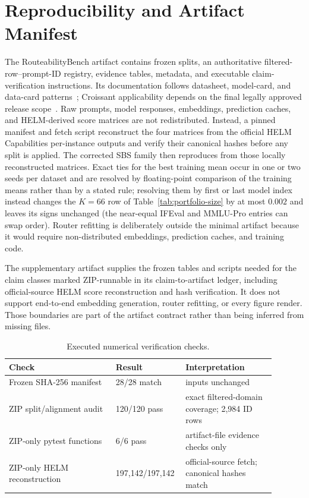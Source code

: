 \documentclass{article}
\begin{document}
\section{Reproducibility and Artifact Manifest}
\label{app:dataset}

The RouteabilityBench artifact contains frozen splits, an authoritative filtered-row--prompt-ID registry, evidence tables, metadata, and executable claim-verification instructions. Its documentation follows datasheet, model-card, and data-card patterns~\citep{gebru2021datasheets, mitchell2019modelcards, pushkarna2022datacards}; Croissant applicability depends on the final legally approved release scope~\citep{akhtar2024croissant}. Raw prompts, model responses, embeddings, prediction caches, and HELM-derived score matrices are not redistributed. Instead, a pinned manifest and fetch script reconstruct the four matrices from the official HELM Capabilities per-instance outputs and verify their canonical hashes before any split is applied. The corrected SBS family then reproduces from those locally reconstructed matrices. Exact ties for the best training mean occur in one or two seeds per dataset and are resolved by floating-point comparison of the training means rather than by a stated rule; resolving them by first or last model index instead changes the $K=66$ row of Table~\ref{tab:portfolio-size} by at most $0.002$ and leaves its signs unchanged (the near-equal IFEval and MMLU-Pro entries can swap order). Router refitting is deliberately outside the minimal artifact because it would require non-distributed embeddings, prediction caches, and training code.

The supplementary artifact supplies the frozen tables and scripts needed for the claim classes marked ZIP-runnable in its claim-to-artifact ledger, including official-source HELM score reconstruction and hash verification. It does not support end-to-end embedding generation, router refitting, or every figure render. Those boundaries are part of the artifact contract rather than being inferred from missing files.

\begin{table}[htbp]
  \caption{Executed numerical verification checks.}
  \label{tab:main-repro-audit}
  \centering
  \small
  \begin{tabular}{p{0.38\linewidth}p{0.19\linewidth}p{0.32\linewidth}}
    \toprule
    Check & Result & Interpretation \\
    \midrule
    Frozen SHA-256 manifest & 28/28 match & inputs unchanged \\
    ZIP split/alignment audit & 120/120 pass & exact filtered-domain coverage; 2,984 ID rows \\
    ZIP-only pytest functions & 6/6 pass & artifact-file evidence checks only \\
    ZIP-only HELM reconstruction & 197,142/197,142 & official-source fetch; canonical hashes match \\
    \bottomrule
  \end{tabular}
\end{table}
\end{document}
